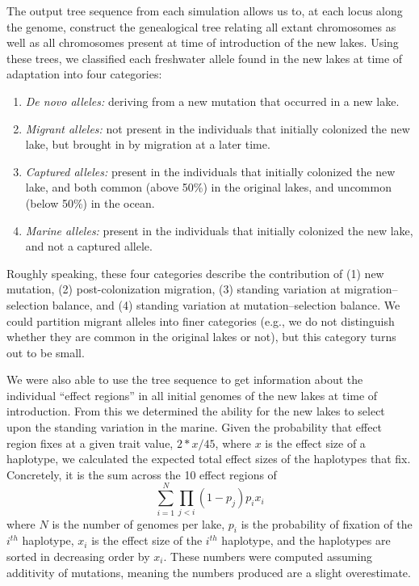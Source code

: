 \documentclass{article}
\begin{document}
The output tree sequence from each simulation allows us to,
at each locus along the genome,
construct the genealogical tree relating all extant chromosomes
as well as all chromosomes present at time of introduction of the new lakes.
Using these trees,
we classified each freshwater allele found in the new lakes at time of adaptation
into four categories:
\begin{enumerate}
    \item \emph{De novo alleles:}
        deriving from a new mutation that occurred in a new lake.
    \item \emph{Migrant alleles:} 
        not present in the individuals that initially colonized the new lake, 
        but brought in by migration at a later time.
    \item \emph{Captured alleles:}
        present in the individuals that initially colonized the new lake, 
        and both common (above 50\%) in the original lakes,
        and uncommon (below 50\%) in the ocean.
    \item \emph{Marine alleles:} 
        present in the individuals that initially colonized the new lake, 
        and not a captured allele.
\end{enumerate}
Roughly speaking, these four categories describe the contribution of
(1) new mutation, 
(2) post-colonization migration, 
(3) standing variation at migration--selection balance, and
(4) standing variation at mutation--selection balance.
We could partition migrant alleles into finer categories
(e.g., we do not distinguish whether they are common in the original lakes or not),
but this category turns out to be small.


We were also able to use the tree sequence to get information about the individual ``effect regions''
in all initial genomes of the new lakes at time of introduction.
From this we determined the ability for the new lakes to select upon the standing variation in the marine.
Given the probability that effect region fixes at a given trait value, $2 * x / 45$, where $x$ is the effect size of a haplotype,
we calculated the expected total effect sizes of the haplotypes that fix.
Concretely, it is the sum across the 10 effect regions of
$$\sum_{i=1}^N \prod_{j < i} (1 - p_j) p_i x_i$$
where $N$ is the number of genomes per lake, $p_i$ is the probability of fixation of the 
$i^{th}$ haplotype, $x_{i}$ is the effect size of the $i^{th}$ haplotype, and the haplotypes are sorted in decreasing order by $x_{i}$.
These numbers were computed assuming additivity of mutations, meaning the numbers produced are a slight overestimate.
\end{document}
